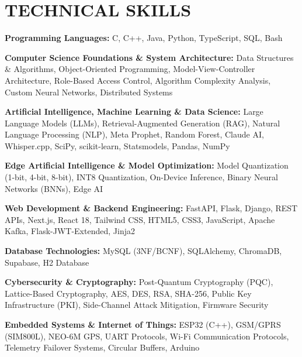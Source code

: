 \documentclass[11pt,letterpaper]{article}
\begin{document}

\section{TECHNICAL SKILLS}

\textbf{Programming Languages:}
C, C++, Java, Python, TypeScript, SQL, Bash

\vspace{2pt}

\textbf{Computer Science Foundations \& System Architecture:}
Data Structures \& Algorithms, Object-Oriented Programming, Model-View-Controller Architecture, Role-Based Access Control, Algorithm Complexity Analysis, Custom Neural Networks, Distributed Systems

\vspace{2pt}

\textbf{Artificial Intelligence, Machine Learning \& Data Science:}
Large Language Models (LLMs), Retrieval-Augmented Generation (RAG), Natural Language Processing (NLP), Meta Prophet, Random Forest, Claude AI, Whisper.cpp, SciPy, scikit-learn, Statsmodels, Pandas, NumPy

\vspace{2pt}

\textbf{Edge Artificial Intelligence \& Model Optimization:}
Model Quantization (1-bit, 4-bit, 8-bit), INT8 Quantization, On-Device Inference, Binary Neural Networks (BNNs), Edge AI

\vspace{2pt}

\textbf{Web Development \& Backend Engineering:}
FastAPI, Flask, Django, REST APIs, Next.js, React 18, Tailwind CSS, HTML5, CSS3, JavaScript, Apache Kafka, Flask-JWT-Extended, Jinja2

\vspace{2pt}

\textbf{Database Technologies:}
MySQL (3NF/BCNF), SQLAlchemy, ChromaDB, Supabase, H2 Database

\vspace{2pt}

\textbf{Cybersecurity \& Cryptography:}
Post-Quantum Cryptography (PQC), Lattice-Based Cryptography, AES, DES, RSA, SHA-256, Public Key Infrastructure (PKI), Side-Channel Attack Mitigation, Firmware Security

\vspace{2pt}

\textbf{Embedded Systems \& Internet of Things:}
ESP32 (C++), GSM/GPRS (SIM800L), NEO-6M GPS, UART Protocols, Wi-Fi Communication Protocols, Telemetry Failover Systems, Circular Buffers, Arduino
\end{document}
